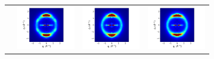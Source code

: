 \documentclass[journal=jpcbfk,manusciprt=article]{achemso}
\begin{document}
\begin{figure}[!htb]
\begin{subfigure}{0.915\textwidth}
\begin{tabular}{@{}c@{ }c@{ }c@{ }c@{}}
  	\rowname{Sandwiched}&
  	\includegraphics[width=.28\linewidth,trim={1cm 0 1.3cm 0},clip]{solvated_layered_rzplot_1.png}&
  	\includegraphics[width=.28\linewidth,trim={1cm 0 1.3cm 0},clip]{solvated_layered_rzplot_25.png}&
  	\includegraphics[width=.28\linewidth,trim={1cm 0 1.3cm 0},clip]{solvated_layered_rzplot_5.png}\\[-1ex]
  	\end{tabular}
  \end{subfigure}
  \begin{subfigure}{0.075\textwidth}

\end{subfigure}
\end{figure}
\end{document}
